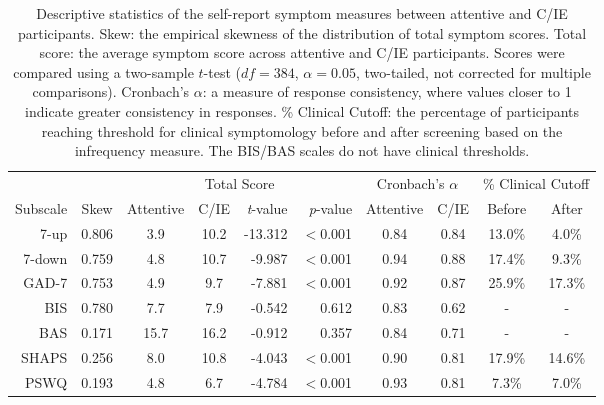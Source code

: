 \documentclass[a4paper,notitlepage,12pt]{article}
\begin{document}
\clearpage
\begin{table}[h]
    \centering
    \small
    \setlength{\tabcolsep}{6pt}
    \begin{tabular}{rcccrrcccc}
        \toprule
        & & \multicolumn{4}{c}{Total Score} & \multicolumn{2}{c}{Cronbach's $\alpha$} & \multicolumn{2}{c}{\% Clinical Cutoff} \\
        \cmidrule(lr){3-6} \cmidrule(lr){7-8} \cmidrule(lr){9-10}
         Subscale & Skew & Attentive & C/IE & \textit{t}-value & \textit{p}-value & Attentive & C/IE & Before & After \\
        \midrule
        7-up   &  0.806 &     3.9 &    10.2 &  -13.312 &   $<$0.001 &    0.84 &    0.84 &     13.0\% &      4.0\% \\
        7-down &  0.759 &     4.8 &    10.7 &   -9.987 &   $<$0.001 &    0.94 &    0.88 &     17.4\% &      9.3\% \\
        GAD-7  &  0.753 &     4.9 &     9.7 &   -7.881 &   $<$0.001 &    0.92 &    0.87 &     25.9\% &     17.3\% \\
        BIS    &  0.780 &     7.7 &     7.9 &   -0.542 &   0.612 &    0.83 &    0.62 &        - &        - \\
        BAS    &  0.171 &    15.7 &    16.2 &   -0.912 &   0.357 &    0.84 &    0.71 &        - &        - \\
        SHAPS  &  0.256 &     8.0 &    10.8 &   -4.043 &   $<$0.001 &    0.90 &    0.81 &     17.9\% &     14.6\% \\
        PSWQ   &  0.193 &     4.8 &     6.7 &   -4.784 &   $<$0.001 &    0.93 &    0.81 &      7.3\% &      7.0\% \\
        \bottomrule
    \end{tabular}
    \caption{Descriptive statistics of the self-report symptom measures between attentive and C/IE participants. Skew: the empirical skewness of the distribution of total symptom scores. Total score: the average symptom score across attentive and C/IE participants. Scores were compared using a two-sample $t$-test ($df = 384$, $\alpha = 0.05$, two-tailed, not corrected for multiple comparisons). Cronbach's $\alpha$: a measure of response consistency, where values closer to 1 indicate greater consistency in responses. \% Clinical Cutoff: the percentage of participants reaching threshold for clinical symptomology before and after screening based on the infrequency measure. The BIS/BAS scales do not have clinical thresholds.}
    \label{tab:tab02}
\end{table}
\end{document}
